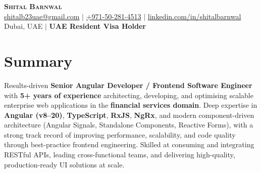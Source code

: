 \documentclass[letterpaper,10.5pt]{article}
\begin{document}
\begin{center}
    {\Huge \scshape \textbf{Shital Barnwal}} \\[3pt]
    \small
    \href{mailto:shitalb23uae@gmail.com}{shitalb23uae@gmail.com} \;$|$\;
    \href{tel:+971502814513}{+971-50-281-4513} \;$|$\;
    \href{https://www.linkedin.com/in/shitalbarnwal}{linkedin.com/in/shitalbarnwal} \\[2pt]
    Dubai, UAE \;$|$\; \textbf{UAE Resident Visa Holder}
\end{center}

\section{Summary}
\small{Results-driven \textbf{Senior Angular Developer / Frontend Software Engineer} with \textbf{5+ years of experience} architecting, developing, and optimising scalable enterprise web applications in the \textbf{financial services domain}. Deep expertise in \textbf{Angular (v8--20)}, \textbf{TypeScript}, \textbf{RxJS}, \textbf{NgRx}, and modern component-driven architecture (Angular Signals, Standalone Components, Reactive Forms), with a strong track record of improving performance, scalability, and code quality through best-practice frontend engineering. Skilled at consuming and integrating RESTful APIs, leading cross-functional teams, and delivering high-quality, production-ready UI solutions at scale.}

\end{document}
